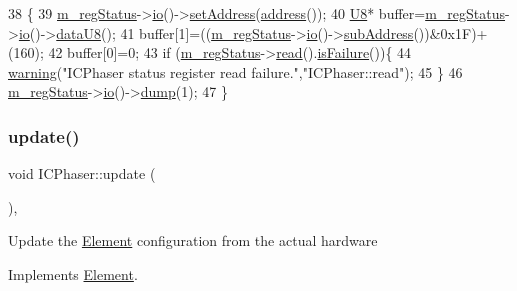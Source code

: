 \begin{DoxyCode}
38                       \{
39   \hyperlink{classICPhaser_adcc37517abf1390407003c387008262d}{m\_regStatus}->\hyperlink{classIOobject_af04fb94137c3d86849f478ac5afab5d1}{io}()->\hyperlink{classIOdata_af98cbfbc28346ebb9b64ca0203af1463}{setAddress}(\hyperlink{classICPhaser_ac5cd0f3cb56324782ae8d360944a94fd}{address}());
40   \hyperlink{ICECALv3_8h_a3cb25ca6f51f003950f9625ff05536fc}{U8}* buffer=\hyperlink{classICPhaser_adcc37517abf1390407003c387008262d}{m\_regStatus}->\hyperlink{classIOobject_af04fb94137c3d86849f478ac5afab5d1}{io}()->\hyperlink{classIOdata_a75e9c318dbac3a39402179070943d4bc}{dataU8}();
41   buffer[1]=((\hyperlink{classICPhaser_adcc37517abf1390407003c387008262d}{m\_regStatus}->\hyperlink{classIOobject_af04fb94137c3d86849f478ac5afab5d1}{io}()->\hyperlink{classIOdata_a25df48b84364a468373260f823ed9c5f}{subAddress}())&0x1F)+(160);
42   buffer[0]=0;
43   \textcolor{keywordflow}{if} (\hyperlink{classICPhaser_adcc37517abf1390407003c387008262d}{m\_regStatus}->\hyperlink{classIOobject_aa07610c11963b1db6710e3c76ceea456}{read}().\hyperlink{classStatusCode_a5dd22dc6eb2c52fc4cabc58f6dea2eb7}{isFailure}())\{
44     \hyperlink{classObject_a65cd4fda577711660821fd2cd5a3b4c9}{warning}(\textcolor{stringliteral}{"ICPhaser status register read failure."},\textcolor{stringliteral}{"ICPhaser::read"});
45   \}
46   \hyperlink{classICPhaser_adcc37517abf1390407003c387008262d}{m\_regStatus}->\hyperlink{classIOobject_af04fb94137c3d86849f478ac5afab5d1}{io}()->\hyperlink{classIOdata_a208e24222bf2044a4ff8bbb1a6bdc13b}{dump}(1);
47 \}
\end{DoxyCode}
\mbox{\label{classICPhaser_a69e1f428f33dbdc5b6f00027c022a4e7}} 
\subsubsection{\texorpdfstring{update()}{update()}}
{\footnotesize\ttfamily void I\+C\+Phaser\+::update (\begin{DoxyParamCaption}{ }\end{DoxyParamCaption})\hspace{0.3cm}{\ttfamily [inline]}, {\ttfamily [virtual]}}

Update the \hyperlink{classElement}{Element} configuration from the actual hardware 

Implements \hyperlink{classElement_a4e6c83efae95616ebddd03c793a26661}{Element}.



